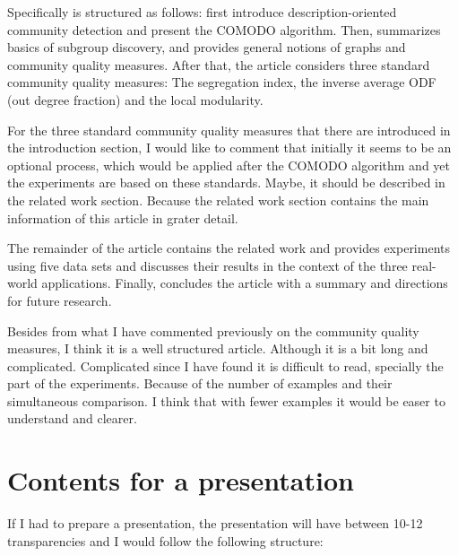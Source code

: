 \documentclass[a4paper]{article}
\begin{document}
\newpage

Specifically is structured as follows: first introduce description-oriented community detection and present the COMODO algorithm. Then, summarizes basics of subgroup discovery, and provides general notions of graphs and community quality measures. After that, the article considers three standard community quality measures: The segregation index, the inverse average ODF (out degree fraction) and the local modularity.
\vskip 0.35cm

For the three standard community quality measures that there are introduced in the introduction section, I would like to comment that initially it seems to be an optional process, which would be applied after the COMODO algorithm and yet the experiments are based on these standards. Maybe, it should be described in the related work section. Because the related work section contains the main information of this article in grater detail.
\vskip 0.35cm

The remainder of the article contains the related work and provides experiments using five data sets and discusses their results in the context of the three real-world applications. Finally, concludes the article with a summary and directions for future research.
\vskip 0.35cm

Besides from what I have commented previously on the community quality measures, I think it is a well structured article. Although it is a bit long and complicated. Complicated since I have found it is difficult to read, specially the part of the experiments. Because of the number of examples and their simultaneous comparison. I think that with fewer examples it would be easer to understand and clearer.

\section*{Contents for a presentation}
If I had to prepare a presentation, the presentation will have between 10-12 transparencies and I would follow the following structure:
\end{document}
